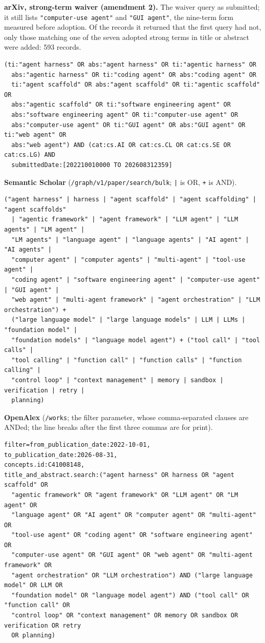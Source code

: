 \noindent\textbf{arXiv, strong-term waiver (amendment 2).} The waiver query as submitted; it still
lists \texttt{"computer-use agent"} and \texttt{"GUI agent"}, the nine-term form measured before
adoption. Of the records it returned that the first query had not, only those matching one of the
seven adopted strong terms in title or abstract were added: 593 records.
{\footnotesize
\begin{verbatim}
(ti:"agent harness" OR abs:"agent harness" OR ti:"agentic harness" OR
  abs:"agentic harness" OR ti:"coding agent" OR abs:"coding agent" OR
  ti:"agent scaffold" OR abs:"agent scaffold" OR ti:"agentic scaffold" OR
  abs:"agentic scaffold" OR ti:"software engineering agent" OR
  abs:"software engineering agent" OR ti:"computer-use agent" OR
  abs:"computer-use agent" OR ti:"GUI agent" OR abs:"GUI agent" OR ti:"web agent" OR
  abs:"web agent") AND (cat:cs.AI OR cat:cs.CL OR cat:cs.SE OR cat:cs.LG) AND
  submittedDate:[202210010000 TO 202608312359]
\end{verbatim}
}

\noindent\textbf{Semantic Scholar} (\texttt{/graph/v1/paper/search/bulk}; \texttt{|} is OR,
\texttt{+} is AND).
{\footnotesize
\begin{verbatim}
("agent harness" | harness | "agent scaffold" | "agent scaffolding" | "agent scaffolds"
  | "agentic framework" | "agent framework" | "LLM agent" | "LLM agents" | "LM agent" |
  "LM agents" | "language agent" | "language agents" | "AI agent" | "AI agents" |
  "computer agent" | "computer agents" | "multi-agent" | "tool-use agent" |
  "coding agent" | "software engineering agent" | "computer-use agent" | "GUI agent" |
  "web agent" | "multi-agent framework" | "agent orchestration" | "LLM orchestration") +
  ("large language model" | "large language models" | LLM | LLMs | "foundation model" |
  "foundation models" | "language model agent") + ("tool call" | "tool calls" |
  "tool calling" | "function call" | "function calls" | "function calling" |
  "control loop" | "context management" | memory | sandbox | verification | retry |
  planning)
\end{verbatim}
}

\noindent\textbf{OpenAlex} (\texttt{/works}; the filter parameter, whose comma-separated clauses are
ANDed; the line breaks after the first three commas are for print).
{\footnotesize
\begin{verbatim}
filter=from_publication_date:2022-10-01,
to_publication_date:2026-08-31,
concepts.id:C41008148,
title_and_abstract.search:("agent harness" OR harness OR "agent scaffold" OR
  "agentic framework" OR "agent framework" OR "LLM agent" OR "LM agent" OR
  "language agent" OR "AI agent" OR "computer agent" OR "multi-agent" OR
  "tool-use agent" OR "coding agent" OR "software engineering agent" OR
  "computer-use agent" OR "GUI agent" OR "web agent" OR "multi-agent framework" OR
  "agent orchestration" OR "LLM orchestration") AND ("large language model" OR LLM OR
  "foundation model" OR "language model agent") AND ("tool call" OR "function call" OR
  "control loop" OR "context management" OR memory OR sandbox OR verification OR retry
  OR planning)
\end{verbatim}
}


